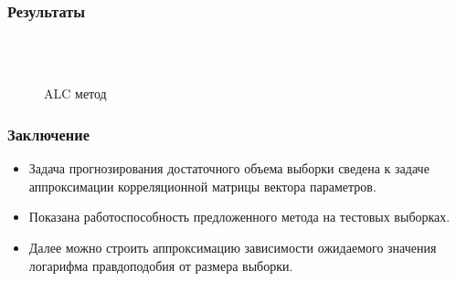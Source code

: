 \documentclass[12pt]{beamer}
\begin{document}
\begin{frame}
\frametitle{Результаты}
\begin{figure}[h!t]\center
{}
\\
\\

\caption{ALC метод}
\label{fig1}
\end{figure}
\end{frame}

\begin{frame}
\frametitle{Заключение}

\begin{itemize}
  \item Задача прогнозирования достаточного объема выборки сведена к задаче аппроксимации корреляционной матрицы вектора параметров.
  \item Показана работоспособность предложенного метода на тестовых выборках.
  \item Далее можно строить аппроксимацию зависимости ожидаемого значения логарифма правдоподобия от размера выборки.
\end{itemize}

\end{frame}
\end{document}
